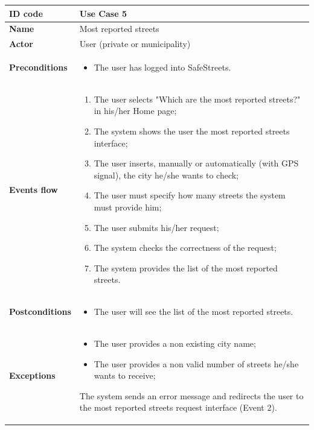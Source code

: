 \documentclass[titlepage]{article}
\begin{document}
\newpage

\begin{longtable}{| p{3 cm} | p{10 cm} |} 
\hline

\textbf{ID code} & Use Case 5 \\ \hline
\textbf{Name} & Most reported streets \\ \hline
\textbf{Actor} & User (private or municipality) \\ \hline
\textbf{Preconditions} & 
\begin{itemize}
\item The user has logged into SafeStreets.
\end{itemize} \\ \hline
\textbf{Events flow} & 
\begin{enumerate}
\item The user selects "Which are the most reported streets?" in his/her Home page;
\item The system shows the user the most reported streets interface;
\item The user inserts, manually or automatically (with GPS signal), the city he/she wants to check;
\item The user must specify how many streets the system must provide him;
\item The user submits his/her request;
\item The system checks the correctness of the request;
\item The system provides the list of the most reported streets.
\end{enumerate} \\ \hline
\textbf{Postconditions} & 
\begin{itemize}
\item The user will see the list of the most reported streets.
\end{itemize} \\ \hline
\textbf{Exceptions} &
\begin{itemize}
\item The user provides a non existing city name;
\item The user provides a non valid number of streets he/she wants to receive;
\end{itemize}
The system sends an error message and redirects the user to the most reported streets request interface (Event 2). \\ \hline

\end{longtable}
\end{document}

